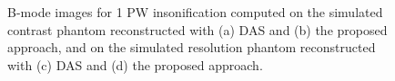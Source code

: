 \documentclass[conference]{IEEEtran}
\begin{document}
\begin{figure}[htb]
	\hfill%
	\hfill%
	\caption{B-mode images for 1 PW insonification computed on the simulated contrast phantom reconstructed with (a) DAS and (b) the proposed approach, and on the simulated resolution phantom reconstructed with (c) DAS and (d) the proposed approach.}
	\label{fig:Bmode}
\end{figure}
\end{document}
